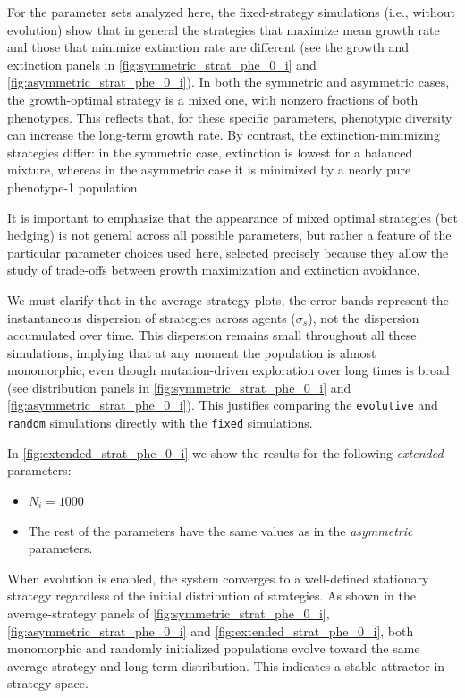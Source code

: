 \documentclass[a4paper,10pt,twocolumn]{article}
\begin{document}
For the parameter sets analyzed here, the fixed-strategy simulations (i.e., without evolution) show that in general the strategies that maximize mean growth rate and those that minimize extinction rate are different (see the growth and extinction panels in \autoref{fig:symmetric_strat_phe_0_i} and \autoref{fig:asymmetric_strat_phe_0_i}). In both the symmetric and asymmetric cases, the growth-optimal strategy is a mixed one, with nonzero fractions of both phenotypes. This reflects that, for these specific parameters, phenotypic diversity can increase the long-term growth rate. By contrast, the extinction-minimizing strategies differ: in the symmetric case, extinction is lowest for a balanced mixture, whereas in the asymmetric case it is minimized by a nearly pure phenotype-1 population.

It is important to emphasize that the appearance of mixed optimal strategies (bet hedging) is not general across all possible parameters, but rather a feature of the particular parameter choices used here, selected precisely because they allow the study of trade-offs between growth maximization and extinction avoidance.

We must clarify that in the average-strategy plots, the error bands represent the instantaneous dispersion of strategies across agents ($\sigma_s$), not the dispersion accumulated over time. This dispersion remains small throughout all these simulations, implying that at any moment the population is almost monomorphic, even though mutation-driven exploration over long times is broad (see distribution panels in \autoref{fig:symmetric_strat_phe_0_i} and \autoref{fig:asymmetric_strat_phe_0_i}). This justifies comparing the \texttt{evolutive} and \texttt{random} simulations directly with the \texttt{fixed} simulations.

In \autoref{fig:extended_strat_phe_0_i} we show the results for the following \emph{extended} parameters:
\begin{itemize}
    \item $N_i=1000$
    \item The rest of the parameters have the same values as in the \emph{asymmetric} parameters.
\end{itemize}

When evolution is enabled, the system converges to a well-defined stationary strategy regardless of the initial distribution of strategies. As shown in the average-strategy panels of \autoref{fig:symmetric_strat_phe_0_i}, \autoref{fig:asymmetric_strat_phe_0_i} and \autoref{fig:extended_strat_phe_0_i}, both monomorphic and randomly initialized populations evolve toward the same average strategy and long-term distribution. This indicates a stable attractor in strategy space.
\end{document}
